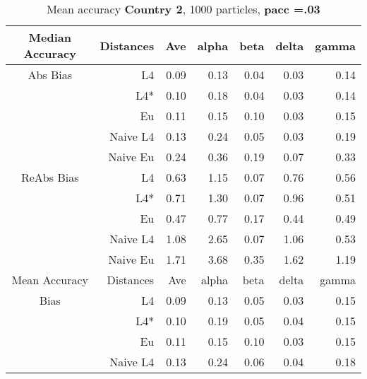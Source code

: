 \documentclass[a4paper,12pt,twoside]{book}
\begin{document}

\begin{table}[H]

\centering
\vfill
\caption{Mean  accuracy \textbf{Country 2}, 1000 particles, \textbf{pacc =.03}}


\begin{tabular}{crrrrrr}
  \hline
  
{\color{blue}Median Accuracy} & Distances & Ave & alpha & beta & delta & gamma \\ 
  \hline
{\color{blue}Abs Bias} & L4  & 0.09 & 0.13 & 0.04 & 0.03 & 0.14 \\ 
  
&L4*  &0.10 & 0.18 & 0.04 & 0.03 & 0.14 \\ 
   
&Eu &  0.11 & 0.15 & 0.10 & 0.03 & 0.15 \\ 
  
&Naive L4&      0.13 & 0.24 & 0.05 & 0.03 & 0.19 \\
  
&Naive Eu & 0.24 & 0.36 & 0.19 & 0.07 & 0.33 \\ 
 
   \hline
   
{\color{blue} ReAbs Bias } & L4  &0.63 & 1.15 & 0.07 & 0.76 & 0.56 \\ 
   
&L4*  &0.71 & 1.30 & 0.07 & 0.96 & 0.51 \\ 
  
&Eu &   
  0.47 & 0.77 & 0.17 & 0.44 & 0.49 \\ 
  
&Naive L4&   1.08 & 2.65 & 0.07 & 1.06 & 0.53 \\
   
&Naive Eu &    1.71 & 3.68 & 0.35 & 1.62 & 1.19 \\ 
 
   \hline
{\color{blue}Mean Accuracy} & Distances & Ave & alpha & beta & delta & gamma \\ 
  \hline
{\color{blue}Bias} & L4  &0.09 & 0.13 & 0.05 & 0.03 & 0.15 \\ 
 
&L4*  & 0.10 & 0.19 & 0.05 & 0.04 & 0.15 \\ 
  
  
&Eu & 0.11 & 0.15 & 0.10 & 0.03 & 0.15 \\ 
 
&Naive L4&  
  0.13 & 0.24 & 0.06 & 0.04 & 0.18 \\ 
  

\end{tabular}
\end{table}
\end{document}
